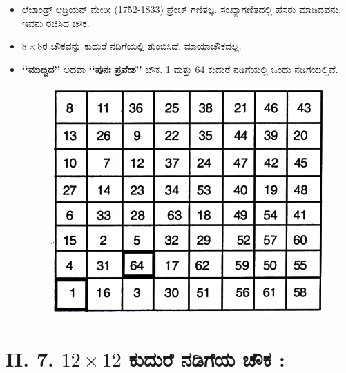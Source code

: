 \begin{itemize}
	\item ಲೆಜಾಂಡ್ರ್ ಆಡ್ರಿಯನ್ ಮೇರೀ (1752-1833) ಫ್ರೆಂಚ್ ಗಣಿತಜ್ಞ. ಸಂಖ್ಯಾಗಣಿತದಲ್ಲಿ ಹೆಸರು ಮಾಡಿದವನು. ಇವನು ರಚಿಸಿದ ಚೌಕ.
	\item $8 \times 8$ರ ಚೌಕವನ್ನು ಕುದುರೆ ನಡಿಗೆಯಲ್ಲಿ ತುಂಬಿಸಿದೆ. ಮಾಯಾಚೌಕವಲ್ಲ.
	\item \textbf{‘‘ಮುಚ್ಚಿದ’’} ಅಥವಾ  \textbf{‘‘ಪುನಃ ಪ್ರವೇಶ’’} ಚೌಕ. 1 ಮತ್ತು 64 ಕುದುರೆ ನಡಿಗೆಯಲ್ಲಿ ಒಂದು ನಡಿಗೆಯಲ್ಲಿವೆ.
	\begin{figure}[H]
	\includegraphics[scale=.9]{src/figures/chap6/fig6-9.jpg}
	\end{figure}
\end{itemize}

\section*{II. 7. $12 \times 12$ ಕುದುರೆ ನಡಿಗೆಯ ಚೌಕ :}

